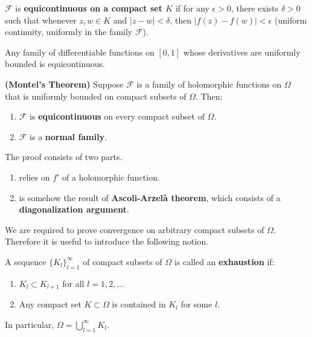 \documentclass{article}
\begin{document}
\begin{definition}
$\mathcal{F}$ is \textbf{equicontinuous on a compact set $K$} if for any $\epsilon > 0$, there exists $\delta > 0$ such that whenever $z, w \in K$ and $|z-w| < \delta$, then $|f(z) - f(w)| < \epsilon$ (uniform continuity, uniformly in the family $\mathcal{F}$).
\end{definition}

\begin{example}
Any family of differentiable functions on $[0,1]$ whose derivatives are uniformly bounded is equicontinuous.
\end{example}

\begin{theorem}
\textbf{(Montel's Theorem)}
Suppose $\mathcal{F}$ is a family of holomorphic functions on $\Omega$ that is uniformly bounded on compact subsets of $\Omega$. Then:
\begin{enumerate}
    \item $\mathcal{F}$ is \textbf{equicontinuous} on every compact subset of $\Omega$.
    \item $\mathcal{F}$ is a \textbf{normal family}.
\end{enumerate}
\end{theorem}

\begin{remark}
The proof consists of two parts.
\begin{enumerate}
    \item relies on $f'$ of a holomorphic function.
    \item is somehow the result of \textbf{Ascoli-Arzel\`a theorem}, which consists of a \textbf{diagonalization argument}.
\end{enumerate}

We are required to prove convergence on arbitrary compact subsets of $\Omega$. Therefore it is useful to introduce the following notion.
\end{remark}

\begin{definition}
A sequence $\{K_l\}_{l=1}^\infty$ of compact subsets of $\Omega$ is called an \textbf{exhaustion} if:
\begin{enumerate}
    \item $K_l \subset K_{l+1}$ for all $l=1, 2, \dots$
    \item Any compact set $K \subset \Omega$ is contained in $K_l$ for some $l$.
\end{enumerate}
In particular, $\Omega = \bigcup_{l=1}^\infty K_l$.
\end{definition}
\end{document}

